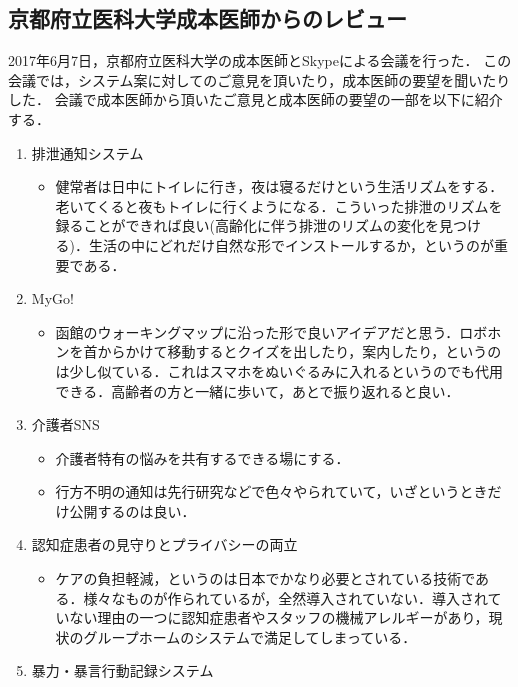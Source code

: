 \documentclass[../report]{subfiles}
\begin{document}
\subsection{京都府立医科大学成本医師からのレビュー}\label{sec:review-narumoto}
2017年6月7日，京都府立医科大学の成本医師とSkypeによる会議を行った．
この会議では，システム案に対してのご意見を頂いたり，成本医師の要望を聞いたりした．
会議で成本医師から頂いたご意見と成本医師の要望の一部を以下に紹介する．
\begin{enumerate}
    \item 排泄通知システム
        \begin{itemize}
            \item 健常者は日中にトイレに行き，夜は寝るだけという生活リズムをする．老いてくると夜もトイレに行くようになる．こういった排泄のリズムを録ることができれば良い(高齢化に伴う排泄のリズムの変化を見つける)．生活の中にどれだけ自然な形でインストールするか，というのが重要である．
        \end{itemize}
    \item MyGo!
        \begin{itemize}
            \item 函館のウォーキングマップに沿った形で良いアイデアだと思う．ロボホンを首からかけて移動するとクイズを出したり，案内したり，というのは少し似ている．これはスマホをぬいぐるみに入れるというのでも代用できる．高齢者の方と一緒に歩いて，あとで振り返れると良い．
        \end{itemize}
    \item 介護者SNS
        \begin{itemize}
            \item 介護者特有の悩みを共有するできる場にする．
            \item 行方不明の通知は先行研究などで色々やられていて，いざというときだけ公開するのは良い．
        \end{itemize}
    \item 認知症患者の見守りとプライバシーの両立
        \begin{itemize}
            \item ケアの負担軽減，というのは日本でかなり必要とされている技術である．様々なものが作られているが，全然導入されていない．導入されていない理由の一つに認知症患者やスタッフの機械アレルギーがあり，現状のグループホームのシステムで満足してしまっている．
        \end{itemize}
    \item 暴力・暴言行動記録システム
        \begin{itemize}

\end{itemize}
\end{enumerate}
\end{document}
